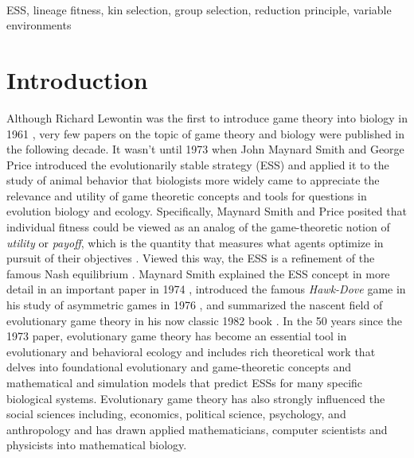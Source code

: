 \documentclass[11pt]{article}
\begin{document}
\vspace{3em}
\\
ESS, lineage fitness, kin selection, group selection, reduction principle, variable environments

\clearpage
\section{Introduction}

Although Richard Lewontin was the first to introduce game theory into biology in 1961 \cite{Lewontin:1961}, very few papers on the topic of game theory and biology were published in the following decade. It wasn't until 1973 when John Maynard Smith and George Price introduced the evolutionarily stable strategy (ESS) and applied it to the study of animal behavior \cite{Maynard-Smith:Price:1973} that biologists more widely came to appreciate the relevance and utility of game theoretic concepts and tools for questions in evolution biology and ecology. Specifically, Maynard Smith and Price posited that individual fitness could be viewed as an analog of the game-theoretic notion of \textit{utility} or \textit{payoff}, which is the quantity that measures what agents optimize in pursuit of their objectives \cite{Myerson:1991}. Viewed this way, the ESS is a refinement of the famous Nash equilibrium \cite{Nash:1950}. Maynard Smith explained the ESS concept in more detail in an important paper in 1974 \cite{Maynard-Smith:1974}, introduced the famous \textit{Hawk-Dove} game in his study of asymmetric games in 1976 \cite{Maynard-Smith:Parker:1976}, and summarized the nascent field of evolutionary game theory in his now classic 1982 book \cite{MaynardSmith:1982}. In the 50 years since the 1973 paper, evolutionary game theory has become an essential tool in evolutionary and behavioral ecology and includes rich theoretical work that delves into foundational evolutionary and game-theoretic concepts and mathematical and simulation models that predict ESSs for many specific biological systems. Evolutionary game theory has also strongly influenced the social sciences including, economics, political science, psychology, and anthropology and has drawn applied mathematicians, computer scientists and physicists into mathematical biology.
\end{document}
